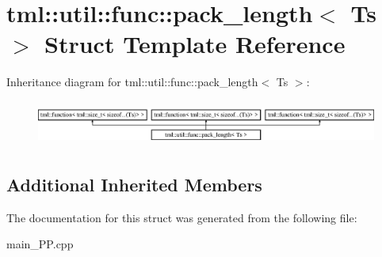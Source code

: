 \hypertarget{structtml_1_1util_1_1func_1_1pack__length}{\section{tml\+:\+:util\+:\+:func\+:\+:pack\+\_\+length$<$ Ts $>$ Struct Template Reference}
\label{structtml_1_1util_1_1func_1_1pack__length}
}
Inheritance diagram for tml\+:\+:util\+:\+:func\+:\+:pack\+\_\+length$<$ Ts $>$\+:\begin{figure}[H]
\begin{center}
\leavevmode
\includegraphics[height=1.505376cm]{structtml_1_1util_1_1func_1_1pack__length}
\end{center}
\end{figure}
\subsection*{Additional Inherited Members}


The documentation for this struct was generated from the following file\+:\begin{DoxyCompactItemize}
\item 
main\+\_\+\+P\+P.\+cpp\end{DoxyCompactItemize}
